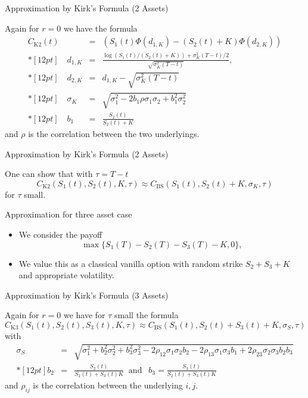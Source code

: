 {Approximation by Kirk's Formula (2 Assets)}

Again for $r=0$ we have the formula $$\begin{array}{lll}
 C_{\mbox{K2}}(t) & = & (S_1(t)\Phi(d_{1,K})-(S_2(t)+K)\Phi(d_{2,K}))
 \\*[12pt]
 \quad d_{1,K} & = & \frac{\log(S_1(t)/(S_2(t)+K))+\sigma_K^{2}(T-t)/2}{\sqrt{\sigma_K^{2}(T-t)}},\\*[12pt]
  \quad d_{2,K} &=&d_{1,K}-\sqrt{\sigma_K^{2}(T-t)}
 \\*[12pt]
 \quad \sigma_K & = & \sqrt{\sigma_1^2-2b_1\rho\sigma_1\sigma_2+b_1^2\sigma_2^2}\\*[12pt]
 \quad b_1 &=& \frac{S_2(t)}{S_2(t)+K}
\end{array}$$
and $\rho$ is the correlation between the two underlyings.

{Approximation by Kirk's Formula (2 Assets)}

One can show that with $\tau=T-t$
$$
 C_{\mbox{K2}}(S_1(t), S_2(t), K, \tau) \approx
 C_{\mbox{BS}}(S_1(t), S_2(t)+K, \sigma_K, \tau)
 $$
  for  $\tau$ small.

{Approximation for three asset case}
\begin{itemize}
\item<1-> We consider the payoff
\begin{equation}
\max\{S_1(T) - S_2(T)- S_3(T)-K, 0\},
\label{Three_asset_value}
\end{equation}
\item<2-> We value this as a classical vanilla option with random strike $S_2+S_3+K$ and appropriate volatility.
\end{itemize}

{Approximation by Kirk's Formula (3 Assets)}

Again for $r=0$ we have for  $\tau$ small the formula
{\small
\begin{equation}
 C_{\mbox{K3}}(S_1(t), S_2(t), S_3(t), K, \tau) \approx
 C_{\mbox{BS}}(S_1(t), S_2(t)+S_3(t)+K, \sigma_S, \tau)
\label{kirk3}
\end{equation}
with
 $$
 \begin{array}{lll}
 \sigma_S & = & \sqrt{\sigma_1^2+b_2^2\sigma_2^2 +b_3^2\sigma_3^2
 - 2\rho_{12}\sigma_1\sigma_2b_2 - 2\rho_{13}\sigma_1\sigma_3b_1 + 2\rho_{23}\sigma_2\sigma_3b_2b_3}\\*[12pt]
 b_2 &=& \frac{S_2(t)}{S_2(t)+S_3(t) K}
 \;\;\mbox{and}  \;\;\
  b_3 = \frac{S_3(t)}{S_2(t)+S_3(t) K}
\end{array}$$
}
and $\rho_{ij}$ is the correlation between the underlying $i,j$.

